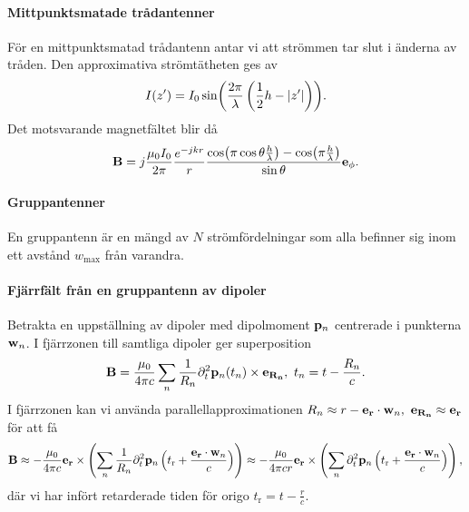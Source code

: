 \paragraph{Mittpunktsmatade trådantenner}
För en mittpunktsmatad trådantenn antar vi att strömmen tar slut i änderna av tråden. Den approximativa strömtätheten ges av
\begin{align*}
	I(z') = I_{0}\sin(\frac{2\pi}{\lambda}\left(\frac{1}{2}h - \abs{z'}\right)).
\end{align*}
Det motsvarande magnetfältet blir då
\begin{align*}
	\vb{B} = j\frac{\mu_{0}I_{0}}{2\pi}\frac{e^{-jkr}}{r}\frac{\cos(\pi\cos{\theta}\frac{h}{\lambda}) - \cos(\pi\frac{h}{\lambda})}{\sin{\theta}}\ub{\phi}.
\end{align*}

\paragraph{Gruppantenner}
En gruppantenn är en mängd av $N$ strömfördelningar som alla befinner sig inom ett avstånd $w_{\text{max}}$ från varandra.

\paragraph{Fjärrfält från en gruppantenn av dipoler}
Betrakta en uppställning av dipoler med dipolmoment $\vb{p}_{n}$ centrerade i punkterna $\vb{w}_{n}$. I fjärrzonen till samtliga dipoler ger superposition
\begin{align*}
	\vb{B} = \frac{\mu_{0}}{4\pi c}\sum\limits_{n}\frac{1}{R_{n}}\del[2]{t}{\vb{p}_{n}}(t_{n})\times\ub{R_{n}},\ t_{n} = t - \frac{R_ {n}}{c}.
\end{align*}
I fjärrzonen kan vi använda parallellapproximationen $R_{n} \approx r - \ub{r}\cdot\vb{w}_{n},\ \ub{R_{n}} \approx \ub{r}$ för att få
\begin{align*}
	\vb{B} \approx -\frac{\mu_{0}}{4\pi c}\ub{r}\times\left(\sum\limits_{n}\frac{1}{R_{n}}\del[2]{t}{\vb{p}_{n}}\left(t_{\text{r}} + \frac{\ub{r}\cdot\vb{w}_{n}}{c}\right)\right) \approx -\frac{\mu_{0}}{4\pi cr}\ub{r}\times\left(\sum\limits_{n}\del[2]{t}{\vb{p}_{n}}\left(t_{\text{r}} + \frac{\ub{r}\cdot\vb{w}_{n}}{c}\right)\right),
\end{align*}
där vi har infört retarderade tiden för origo $t_{\text{r}} = t - \frac{r}{c}$.

